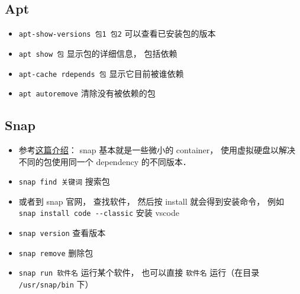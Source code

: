 
\begin{issues}
\issueDraft
\end{issues}

\subsection{Apt}
\begin{itemize}
\item \verb|apt-show-versions 包1 包2| 可以查看已安装包的版本
\item \verb|apt show 包| 显示包的详细信息， 包括依赖
\item \verb|apt-cache rdepends 包| 显示它目前被谁依赖
\item \verb|apt autoremove| 清除没有被依赖的包
\end{itemize}

\subsection{Snap}
\begin{itemize}
\item 参考\href{https://www.howtogeek.com/660193/how-to-work-with-snap-packages-on-linux/}{这篇介绍}： snap 基本就是一些微小的 container， 使用虚拟硬盘以解决不同的包使用同一个 dependency 的不同版本．
\item \verb|snap find 关键词| 搜索包
\item 或者到 snap 官网， 查找软件， 然后按 install 就会得到安装命令， 例如 \verb|snap install code --classic| 安装 vscode
\item \verb|snap version| 查看版本
\item \verb|snap remove| 删除包
\item \verb|snap run 软件名| 运行某个软件， 也可以直接 \verb|软件名| 运行（在目录 \verb|/usr/snap/bin| 下）
\end{itemize}
